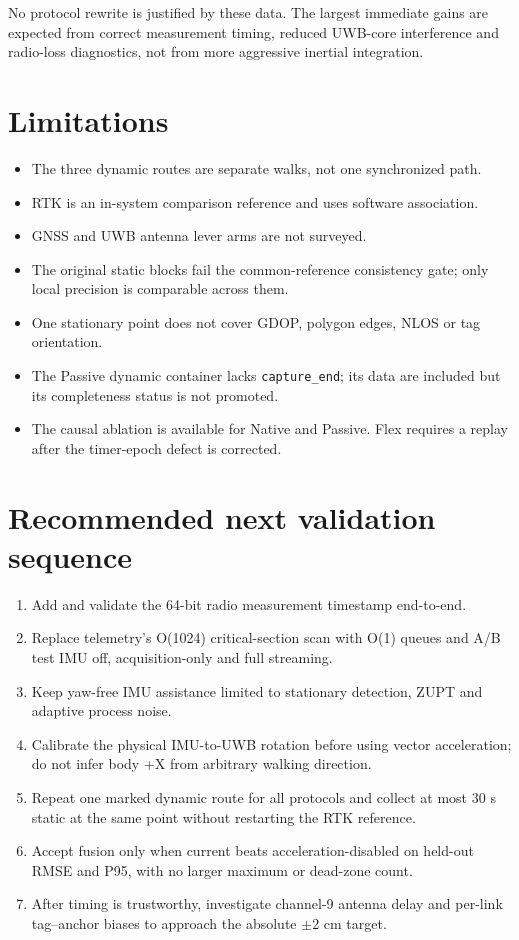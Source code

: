 \documentclass[10pt,a4paper]{article}
\begin{document}
No protocol rewrite is justified by these data. The largest immediate gains are
expected from correct measurement timing, reduced UWB-core interference and
radio-loss diagnostics, not from more aggressive inertial integration.

\section{Limitations}
\begin{itemize}
\item The three dynamic routes are separate walks, not one synchronized path.
\item RTK is an in-system comparison reference and uses software association.
\item GNSS and UWB antenna lever arms are not surveyed.
\item The original static blocks fail the common-reference consistency gate;
      only local precision is comparable across them.
\item One stationary point does not cover GDOP, polygon edges, NLOS or tag
      orientation.
\item The Passive dynamic container lacks \texttt{capture\_end}; its data are
      included but its completeness status is not promoted.
\item The causal ablation is available for Native and Passive. Flex requires a
      replay after the timer-epoch defect is corrected.
\end{itemize}

\section{Recommended next validation sequence}
\begin{enumerate}
\item Add and validate the 64-bit radio measurement timestamp end-to-end.
\item Replace telemetry's O(1024) critical-section scan with O(1) queues and
      A/B test IMU off, acquisition-only and full streaming.
\item Keep yaw-free IMU assistance limited to stationary detection, ZUPT and
      adaptive process noise.
\item Calibrate the physical IMU-to-UWB rotation before using vector
      acceleration; do not infer body +X from arbitrary walking direction.
\item Repeat one marked dynamic route for all protocols and collect at most
      30 s static at the same point without restarting the RTK reference.
\item Accept fusion only when current beats acceleration-disabled on held-out
      RMSE and P95, with no larger maximum or dead-zone count.
\item After timing is trustworthy, investigate channel-9 antenna delay and
      per-link tag--anchor biases to approach the absolute $\pm$2 cm target.
\end{enumerate}
\end{document}

